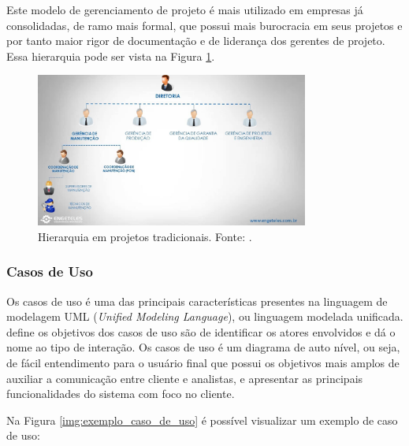 Este modelo de gerenciamento de projeto é mais utilizado em empresas já consolidadas, de ramo mais formal, que possui mais burocracia em seus projetos e por tanto maior rigor de documentação e de liderança dos gerentes de projeto. Essa hierarquia pode ser vista na Figura \ref{img:gerencia_de_projetos_tradicional}.

\begin{figure}[H]
	\centering
	\includegraphics[width=0.8\textwidth]{figuras/gerencia_de_projeto.jpg}
	\caption{Hierarquia em projetos tradicionais. Fonte: .}
	\label{img:gerencia_de_projetos_tradicional}
\end{figure}

\subsubsection{Casos de Uso}
\label{sec:casos_de_uso}

Os casos de uso é uma das principais características presentes na linguagem de modelagem UML (\textit{Unified Modeling Language}), ou linguagem modelada unificada.  define os objetivos dos casos de uso são de identificar os atores envolvidos e dá o nome ao tipo de interação. Os casos de uso é um diagrama de auto nível, ou seja, de fácil entendimento para o usuário final que possui os objetivos mais amplos de auxiliar a comunicação entre cliente e analistas, e apresentar as principais funcionalidades do sistema com foco no cliente.

Na Figura \ref{img:exemplo_caso_de_uso} é possível visualizar um exemplo de caso de uso:

